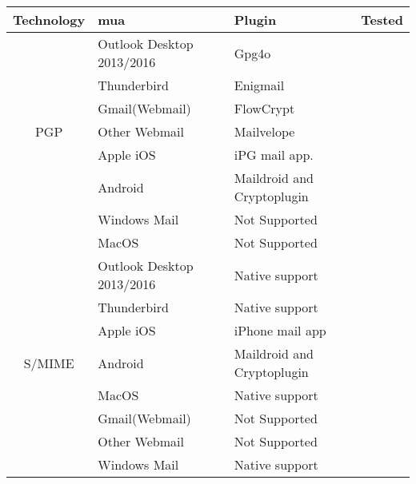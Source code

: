 {\def\arraystretch{1.2}\tabcolsep=3pt
\begin{table*}%
	\scriptsize
	\centering
	\begin{tabular}{|c|l|l|c|}
		\hline
		\textbf{Technology}		& \textbf{\acrlong{mua}}   		& \textbf{Plugin}  				& \textbf{Tested}	\\ \hline
								& Outlook Desktop 2013/2016		& Gpg4o							& \cmark	\\ \cline{2-4}
								& Thunderbird					& Enigmail 						& \cmark 	\\ \cline{2-4}
								& Gmail(Webmail)				& FlowCrypt						& \cmark	\\ \cline{2-4}
		{PGP}					& Other Webmail  				& Mailvelope            		& \cmark	\\ \cline{2-4}
								& Apple iOS						& iPG mail app.         		& \xmark	\\ \cline{2-4}
								& Android						& Maildroid and Cryptoplugin	& \cmark	\\ \cline{2-4}
		     					& Windows Mail 					& Not Supported					& \xmark	\\ \cline{2-4}
		     					& MacOS							& Not Supported					& \xmark 	\\ \hline
		     					
								& Outlook Desktop 2013/2016		& Native support				& \cmark	\\ \cline{2-4}
								& Thunderbird					& Native support 				& \cmark 	\\ \cline{2-4}
								& Apple iOS						& iPhone mail app				& \cmark	\\ \cline{2-4}
		{S/MIME}				& Android						& Maildroid and Cryptoplugin    & \cmark	\\ \cline{2-4}
								& MacOS							& Native support         		& \cmark	\\ \cline{2-4}
								& Gmail(Webmail)				& Not Supported 				& \xmark	\\ \cline{2-4}
								& Other Webmail 				& Not Supported					& \xmark	\\ \cline{2-4}
								& Windows Mail					& Native support				& \xmark 	\\ \hline
								

\end{tabular}
\end{table*}}
